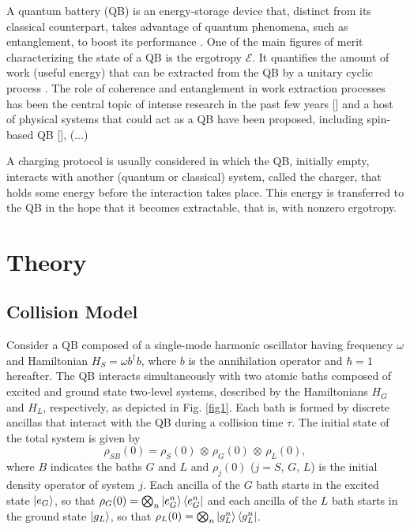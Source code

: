 \documentclass[%
reprint,
superscriptaddress,
amsmath,amssymb,
aps,
pra,
]{revtex4-2}
\begin{document}
A quantum battery (QB) is an energy-storage device that, distinct from its classical counterpart, takes advantage of quantum phenomena, such as entanglement, to boost its performance \cite{alicki2013entanglement, campaioli2024colloquium}. One of the main figures of merit characterizing the state of a QB is the ergotropy $\mathcal{E}$. It quantifies the amount of work (useful energy) that can be extracted from the QB by a unitary cyclic process \cite{allahverdyan2004maximal}. The role of coherence and entanglement in work extraction processes has been the central topic of intense research in the past few years [] and a host of physical systems that could act as a QB have been proposed, including spin-based QB [], (...) 

A charging protocol is usually considered in which the QB, initially empty, interacts with another (quantum or classical) system, called the charger, that holds some energy before the interaction takes place. This energy is transferred to the QB in the hope that it becomes extractable, that is, with nonzero ergotropy. 


\section{Theory}

\subsection{Collision Model}

Consider a QB composed of a single-mode harmonic oscillator having frequency $\omega$ and Hamiltonian $H_S = \omega b^{\dagger}b$, where $b$ is the annihilation operator and $\hbar = 1$ hereafter. The QB interacts simultaneously with two atomic baths composed of excited and ground state two-level systems, described by the Hamiltonians $H_G$ and $H_L$, respectively, as depicted in Fig. \ref{fig1}. Each bath is formed by discrete ancillas that interact with the QB during a collision time $\tau$. The initial state of the total system is given by
\begin{equation}
    \rho_{SB}(0) = \rho_S(0)\, \otimes \, \rho_G(0) \, \otimes \, \rho_L(0),
\end{equation}
 where $B$ indicates the baths $G$ and $L$ and $\rho_j(0)$ ($j = S$, $G$, $L$) is the initial density operator of system $j$. Each ancilla of the $G$ bath starts in the excited state $\ket{e_G}$, so that $\rho_G(0) = \bigotimes_{n}\ket{e_G^n}\bra{e_G^n}$ and each ancilla of the $L$ bath starts in the ground state $\ket{g_L}$, so that $\rho_L(0) = \bigotimes_{n}\ket{g_L^n}\bra{g_L^n}$.
\end{document}
